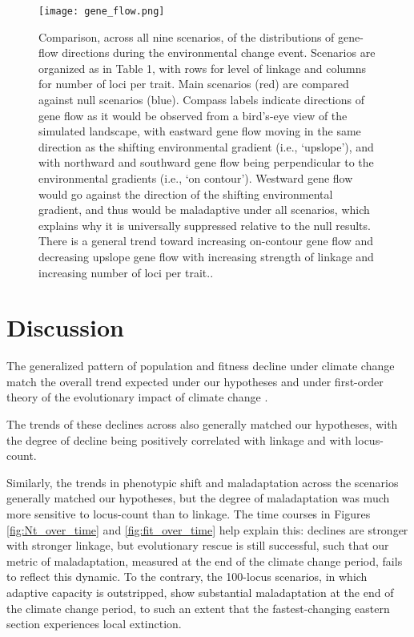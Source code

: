 \documentclass[9pt,twocolumn,twoside,lineno]{pnas-new}
\begin{document}
\begin{figure}
\centering
\texttt{[image: gene\_flow.png]}
\caption{Comparison, across all nine scenarios, of the distributions of gene-flow directions during the environmental change event. Scenarios are organized as in Table 1, with rows for level of linkage and columns for number of loci per trait. Main scenarios (red) are compared against null scenarios (blue). Compass labels indicate directions of gene flow as it would be observed from a bird’s-eye view of the simulated landscape, with eastward gene flow moving in the same direction as the shifting environmental gradient (i.e., ‘upslope’), and with northward and southward gene flow being perpendicular to the environmental gradients (i.e., ‘on contour’). Westward gene flow would go against the direction of the shifting environmental gradient, and thus would be maladaptive under all scenarios, which explains why it is universally suppressed relative to the null results. There is a general trend toward increasing on-contour gene flow and decreasing upslope gene flow with increasing strength of linkage and increasing number of loci per trait..
}
\label{fig:gene_flow}
\end{figure}


\section*{Discussion}
The generalized pattern of population and fitness decline under climate change match the
overall trend expected under our hypotheses and under first-order theory of
the evolutionary impact of climate change \cite{aitken_whitlock}.

The trends of these declines across also generally matched our hypotheses,
with the degree of decline being positively correlated with linkage and with locus-count.

Similarly, the trends in phenotypic shift and maladaptation
across the scenarios generally matched our hypotheses,
but the degree of maladaptation was much more sensitive to
locus-count than to linkage.
The time courses in Figures \ref{fig:Nt_over_time} and \ref{fig:fit_over_time} help explain this: declines
are stronger with stronger linkage, but evolutionary
rescue is still successful, such that our metric of maladaptation,
measured at the end of the climate change period,
fails to reflect this dynamic.
To the contrary, the 100-locus scenarios,
in which adaptive capacity is outstripped,
show substantial maladaptation at the end of the climate
change period, to such an extent that the fastest-changing
eastern section experiences local extinction.
\end{document}
